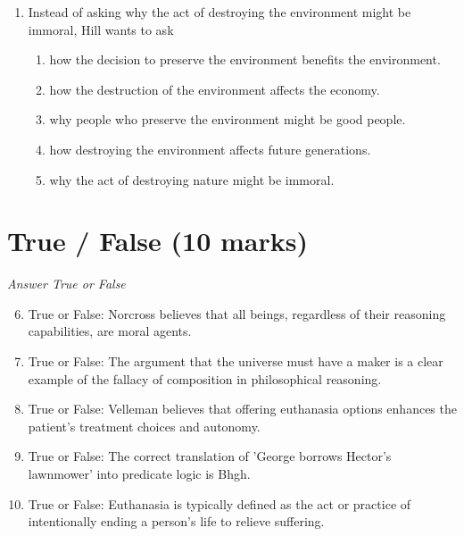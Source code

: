 \documentclass[12pt]{article}
\begin{document}
\begin{enumerate}[label=\arabic*.]
\begin{enumerate}[label=(\alph*)]
    \item a capacity for emotional intelligence
    \item a capacity for scientific understanding
    \item a capacity for communal or friendly relationships
    \item a capacity for certain kinds of feelings or sentiments
    \item a capacity for independent thinking
\end{enumerate}
\item Instead of asking why the act of destroying the environment might be immoral, Hill wants to ask
\begin{enumerate}[label=(\alph*)]
    \item how the decision to preserve the environment benefits the environment.
    \item how the destruction of the environment affects the economy.
    \item why people who preserve the environment might be good people.
    \item how destroying the environment affects future generations.
    \item why the act of destroying nature might be immoral.
\end{enumerate}
\end{enumerate}

\section*{True / False (10 marks)}
\textit{Answer True or False}
\begin{enumerate}[label=\arabic*.]
\setcounter{enumi}{5}
\item True or False: Norcross believes that all beings, regardless of their reasoning capabilities, are moral agents.
\item True or False: The argument that the universe must have a maker is a clear example of the fallacy of composition in philosophical reasoning.
\item True or False: Velleman believes that offering euthanasia options enhances the patient's treatment choices and autonomy.
\item True or False: The correct translation of 'George borrows Hector's lawnmower' into predicate logic is Bhgh.
\item True or False: Euthanasia is typically defined as the act or practice of intentionally ending a person's life to relieve suffering.
\end{enumerate}
\end{document}
